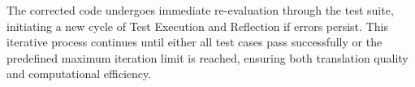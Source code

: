 The corrected code undergoes immediate re-evaluation through the test suite, initiating a new cycle of Test Execution and Reflection if errors persist. This iterative process continues until either all test cases pass successfully or the predefined maximum iteration limit is reached, ensuring both translation quality and computational efficiency.




